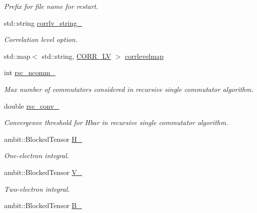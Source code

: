 \begin{DoxyCompactItemize}
\begin{DoxyCompactList}\small\item\em Prefix for file name for restart. \end{DoxyCompactList}\item 
std\+::string \mbox{\hyperlink{classforte_1_1_s_a___m_r_d_s_r_g_aa0734bdace1a7c5ae1f0215e337bf963}{corrlv\+\_\+string\+\_\+}}
\begin{DoxyCompactList}\small\item\em Correlation level option. \end{DoxyCompactList}\item 
std\+::map$<$ std\+::string, \mbox{\hyperlink{classforte_1_1_s_a___m_r_d_s_r_g_ae418b53108b2015f68d267bb26d3e6ba}{C\+O\+R\+R\+\_\+\+LV}} $>$ \mbox{\hyperlink{classforte_1_1_s_a___m_r_d_s_r_g_ae6ba35ecd7c72f25c886277b625f49f3}{corrlevelmap}}
\item 
int \mbox{\hyperlink{classforte_1_1_s_a___m_r_d_s_r_g_a051b54a614c19a66115bd764412544e3}{rsc\+\_\+ncomm\+\_\+}}
\begin{DoxyCompactList}\small\item\em Max number of commutators considered in recursive single commutator algorithm. \end{DoxyCompactList}\item 
double \mbox{\hyperlink{classforte_1_1_s_a___m_r_d_s_r_g_a3e145a07a6e391db3d019b889424338c}{rsc\+\_\+conv\+\_\+}}
\begin{DoxyCompactList}\small\item\em Convergenve threshold for Hbar in recursive single commutator algorithm. \end{DoxyCompactList}\item 
ambit\+::\+Blocked\+Tensor \mbox{\hyperlink{classforte_1_1_s_a___m_r_d_s_r_g_a321988480dd69d59ea23986e76d7487e}{H\+\_\+}}
\begin{DoxyCompactList}\small\item\em One-\/electron integral. \end{DoxyCompactList}\item 
ambit\+::\+Blocked\+Tensor \mbox{\hyperlink{classforte_1_1_s_a___m_r_d_s_r_g_a2d98d0cdfa544104238d1277ca253539}{V\+\_\+}}
\begin{DoxyCompactList}\small\item\em Two-\/electron integral. \end{DoxyCompactList}\item 
ambit\+::\+Blocked\+Tensor \mbox{\hyperlink{classforte_1_1_s_a___m_r_d_s_r_g_acbe42512cbf50dc965b10a946214e87d}{B\+\_\+}}

\end{DoxyCompactItemize}
